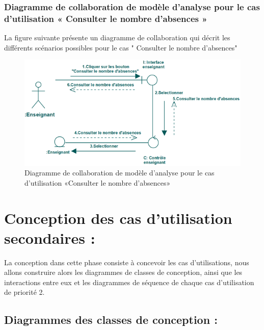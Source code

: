 \documentclass[12 pt]{report}
\begin{document}
\subsubsection{Diagramme  de  collaboration  de  modèle  d'analyse  pour  le  cas  d'utilisation « Consulter le nombre d'absences »  }
La figure suivante présente un diagramme de collaboration qui décrit les différents
scénarios possibles pour le cas " Consulter le nombre d'absences"
\begin{figure}[h]
\begin{center}
\includegraphics[width= 14cm , height =5 cm]{colla_ens_consulternombreabsence.PNG}
 \caption{Diagramme  de  collaboration  de  modèle  d'analyse  pour  le  cas  d'utilisation «Consulter le nombre d'absences»}
\end{center}
\end{figure}

\section{Conception des cas d’utilisation secondaires :}
La conception dans cette phase consiste à concevoir les cas d’utilisations, nous allons construire alors les diagrammes de classes de conception, ainsi que les interactions entre eux et les diagrammes de séquence de chaque cas d’utilisation de priorité 2.
\subsection{Diagrammes des classes de conception :}
\end{document}
